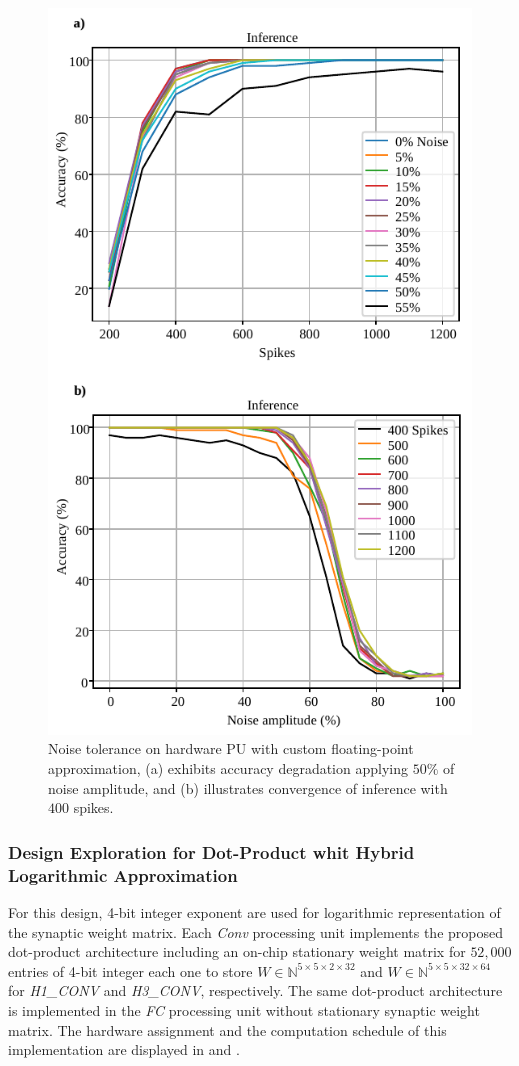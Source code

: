 \begin{figure}[b!]
	\centering
	\includegraphics[width=0.5\columnwidth]{./chapters/sbs_accelerator/figures/accuracy_vs_noise_pu_cfp(4-bit-exponent_1-bit-mantissa).pdf}
	\caption{Noise tolerance on hardware PU with custom floating-point approximation, (a) exhibits accuracy degradation applying $50\%$ of noise amplitude, and (b) illustrates convergence of inference with $400$ spikes.}
	\label{fig:accuracy_vs_noise_pu_cfp}
\end{figure}

\subsubsection{Design Exploration for Dot-Product whit Hybrid Logarithmic Approximation}
For this design, 4-bit integer exponent are used for logarithmic representation of the synaptic weight matrix. Each \emph{Conv} processing unit implements the proposed dot-product architecture including an on-chip stationary weight matrix for $52,000$ entries of 4-bit integer each one to store $W\in\mathbb{N}^{5\times 5\times 2\times 32}$ and $W\in\mathbb{N}^{5\times 5\times 32\times 64}$ for \emph{H1\_CONV} and \emph{H3\_CONV}, respectively. The same dot-product architecture is implemented in the \emph{FC} processing unit without stationary synaptic weight matrix. The hardware assignment and the computation schedule of this implementation are displayed in  and .

